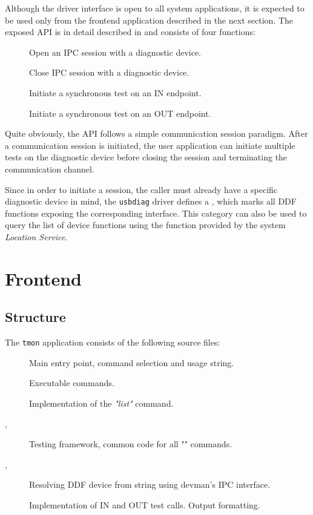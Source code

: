 Although the driver interface is open to all system applications, it is expected
to be used only from the frontend application described in the next section. The
exposed API is in detail described in
 and consists of
four functions:
%
\begin{description}
	\item[] Open an IPC session with a diagnostic device.
	\item[] Close IPC session with a diagnostic device.
	\item[] Initiate a synchronous test on an IN endpoint.
	\item[] Initiate a synchronous test on an OUT
		endpoint.
\end{description}

Quite obviously, the API follows a simple communication session paradigm. After
a communication session is initiated, the user application can initiate multiple
tests on the diagnostic device before closing the session and terminating the
communication channel.

Since in order to initiate a session, the caller must already have a specific
diagnostic device in mind, the \texttt{usbdiag} driver defines a
, which marks all DDF functions exposing the
corresponding interface. This category can also be used to query the list of
device functions using the  function provided by the
system \textit{Location Service}.


\section{Frontend}

\subsection{Structure}

The \texttt{tmon} application consists of the following source files:
%
\begin{description}
	\item[]
		Main entry point, command selection and usage string.
	\item[]
		Executable commands.
	\item[]
		Implementation of the \textit{"list"} command.
	\item[, ]
		Testing framework, common code for all "" commands.
	\item[,
		  ]
		Resolving DDF device from string using devman's IPC interface.
	\item[]
		Implementation of IN and OUT test calls. Output formatting.
\end{description}

